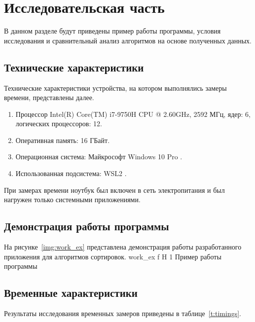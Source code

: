 \chapter{Исследовательская часть}

В данном разделе будут приведены пример работы программы, условия исследования   и сравнительный анализ алгоритмов на основе полученных данных.

\section{Технические характеристики}

Технические характеристики устройства, на котором выполнялись замеры времени, представлены далее.

\begin{enumerate}
	\item Процессор	Intel(R) Core(TM) i7-9750H CPU @ 2.60GHz, 2592 МГц, ядер: 6, логических процессоров: 12.
	\item Оперативная память: 16 ГБайт.
	\item Операционная система: Майкрософт Windows 10 Pro \cite{windows}.
	\item Использованная подсистема: WSL2 \cite{WSL2}.
\end{enumerate}

При замерах времени ноутбук был включен в сеть электропитания и был нагружен только системными приложениями.


\section{Демонстрация работы программы}

На рисунке~\ref{img:work_ex} представлена демонстрация работы разработанного приложения для алгоритмов сортировок.
{work_ex} %
{f} %
{H} %
{1\textwidth} %
{Пример работы программы} %




\section{Временные характеристики}

Результаты исследования временных замеров  приведены в таблице~\ref{t:timings}.
\newpage

